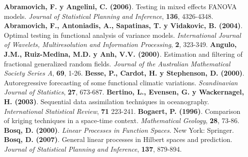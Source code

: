 \begin{thebibliography}{99}

    \lhead[Bibliograf{\'\i}a]{}

    \cfoot{}

         \textbf{Abramovich, F. y Angelini, C. (2006)}. Testing in mixed effects
            FANOVA models. {\em Journal of Statistical Planning and
            Inference}, \textbf{136}, 4326-4348.
         \textbf{Abramovich, F., Antoniadis, A., Sapatinas, T. y Vidakovic, B.
            (2004)}. Optimal testing in functional analysis of variance models.
            {\em International Journal of Wavelets, Multiresolution and Information Processing},
            \textbf{2}, 323-349.
         \textbf{Angulo, J.M., Ruiz-Medina, M.D. y Anh, V.V. (2000)}. Estimation and
            filtering of fractional generalized random fields. \emph{Journal of the Australian Mathematical Society Series A}, \textbf{69}, 1-26.
         \textbf{Besse, P., Cardot, H. y  Stephenson, D. (2000)}.  Autoregressive forecasting
            of some functional climatic variations. {\em Scandinavian Journal of Statistics},  \textbf{27}, 673-687.
         \textbf{Bertino, L., Evensen, G. y Wackernagel, H. (2003)}. Sequential data
            assimilation techniques in oceanography. \emph{International Statistical
            Review}, \textbf{71} 223-241.
         \textbf{Bogaert, P. (1996)}. Comparison of kriging techniques in a
            space-time context. \emph{Mathematical Geology}, \textbf{28},
            73-86.
         \textbf{Bosq, D. (2000)}. \emph{Linear Processes in Function Spaces}. New York: Springer.
         \textbf{Bosq, D. (2007)}. General linear
            processes in Hilbert spaces and prediction.
            \emph{Journal of Statistical Planning and Inference},
            \textbf{137}, 879-894.
\end{thebibliography}
